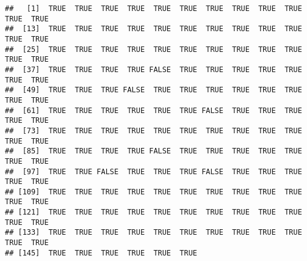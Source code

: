 \documentclass[
]{book}
\newenvironment{Shaded}{\begin{snugshade}}{\end{snugshade}}
\newcommand{\CommentTok}[1]{\textcolor[rgb]{0.56,0.35,0.01}{\textit{#1}}}
\newcommand{\ControlFlowTok}[1]{\textcolor[rgb]{0.13,0.29,0.53}{\textbf{#1}}}
\newcommand{\DataTypeTok}[1]{\textcolor[rgb]{0.13,0.29,0.53}{#1}}
\newcommand{\DecValTok}[1]{\textcolor[rgb]{0.00,0.00,0.81}{#1}}
\newcommand{\KeywordTok}[1]{\textcolor[rgb]{0.13,0.29,0.53}{\textbf{#1}}}
\newcommand{\NormalTok}[1]{#1}
\newcommand{\OperatorTok}[1]{\textcolor[rgb]{0.81,0.36,0.00}{\textbf{#1}}}
\newcommand{\OtherTok}[1]{\textcolor[rgb]{0.56,0.35,0.01}{#1}}
\newcommand{\StringTok}[1]{\textcolor[rgb]{0.31,0.60,0.02}{#1}}
\begin{document}
\begin{Shaded}
\end{Shaded}

\begin{verbatim}
##   [1]  TRUE  TRUE  TRUE  TRUE  TRUE  TRUE  TRUE  TRUE  TRUE  TRUE  TRUE  TRUE
##  [13]  TRUE  TRUE  TRUE  TRUE  TRUE  TRUE  TRUE  TRUE  TRUE  TRUE  TRUE  TRUE
##  [25]  TRUE  TRUE  TRUE  TRUE  TRUE  TRUE  TRUE  TRUE  TRUE  TRUE  TRUE  TRUE
##  [37]  TRUE  TRUE  TRUE  TRUE FALSE  TRUE  TRUE  TRUE  TRUE  TRUE  TRUE  TRUE
##  [49]  TRUE  TRUE  TRUE FALSE  TRUE  TRUE  TRUE  TRUE  TRUE  TRUE  TRUE  TRUE
##  [61]  TRUE  TRUE  TRUE  TRUE  TRUE  TRUE FALSE  TRUE  TRUE  TRUE  TRUE  TRUE
##  [73]  TRUE  TRUE  TRUE  TRUE  TRUE  TRUE  TRUE  TRUE  TRUE  TRUE  TRUE  TRUE
##  [85]  TRUE  TRUE  TRUE  TRUE FALSE  TRUE  TRUE  TRUE  TRUE  TRUE  TRUE  TRUE
##  [97]  TRUE  TRUE FALSE  TRUE  TRUE  TRUE FALSE  TRUE  TRUE  TRUE  TRUE  TRUE
## [109]  TRUE  TRUE  TRUE  TRUE  TRUE  TRUE  TRUE  TRUE  TRUE  TRUE  TRUE  TRUE
## [121]  TRUE  TRUE  TRUE  TRUE  TRUE  TRUE  TRUE  TRUE  TRUE  TRUE  TRUE  TRUE
## [133]  TRUE  TRUE  TRUE  TRUE  TRUE  TRUE  TRUE  TRUE  TRUE  TRUE  TRUE  TRUE
## [145]  TRUE  TRUE  TRUE  TRUE  TRUE  TRUE
\end{verbatim}
\end{document}
